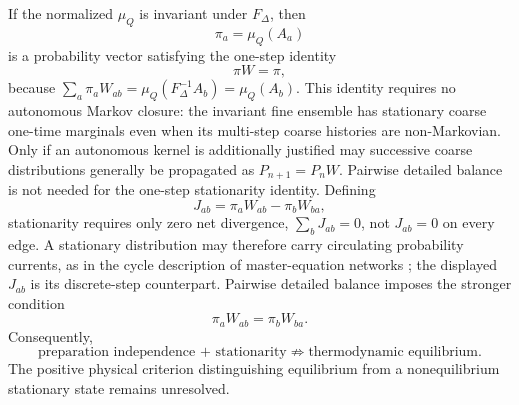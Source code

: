 \documentclass[11pt]{article}
\theoremstyle{definition}
\begin{document}
If the normalized $\mu_Q$ is invariant under $F_\Delta$, then
\begin{equation}
  \pi_a=\mu_Q(A_a)
  \label{eq:stationary-pushforward}
\end{equation}
is a probability vector satisfying the one-step identity
\begin{equation}
  \boxed{\pi W=\pi,}
  \label{eq:global-stationarity}
\end{equation}
because $\sum_a\pi_aW_{ab}=\mu_Q(F_\Delta^{-1}A_b)=\mu_Q(A_b)$.
This identity requires no autonomous Markov closure: the invariant fine ensemble has
stationary coarse one-time marginals even when its multi-step coarse histories are
non-Markovian.  Only if an autonomous kernel is additionally justified may successive
coarse distributions generally be propagated as $P_{n+1}=P_nW$.  Pairwise detailed
balance is not needed for the one-step stationarity identity.  Defining
\begin{equation}
  J_{ab}=\pi_aW_{ab}-\pi_bW_{ba},
  \label{eq:coarse-probability-current}
\end{equation}
stationarity requires only zero net divergence, $\sum_bJ_{ab}=0$, not $J_{ab}=0$ on every
edge.  A stationary distribution may therefore carry circulating probability currents,
as in the cycle description of master-equation networks
\cite{Schnakenberg1976}; the displayed $J_{ab}$ is its discrete-step counterpart.
Pairwise detailed balance imposes the stronger condition
\begin{equation}
  \pi_aW_{ab}=\pi_bW_{ba}.
  \label{eq:detailed-balance-control}
\end{equation}
Consequently,
\begin{equation}
  \boxed{
  \text{preparation independence + stationarity}
  \not\Rightarrow
  \text{thermodynamic equilibrium}.}
  \label{eq:stationary-not-equilibrium}
\end{equation}
The positive physical criterion distinguishing equilibrium from a nonequilibrium stationary
state remains unresolved.
\end{document}
